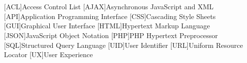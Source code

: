 \documentclass[
  11pt, %
  oneside, %
  english, %
  singlespacing, %
  liststotoc, %
  headsepline, %
  chapterinoneline, %
]{MastersDoctoralThesis} %
\author{Max \textsc{Mustermann}} %
\begin{document}
\frontmatter %

\pagestyle{plain} %

\sloppy





\cleardoublepage







{\hypersetup{linkcolor=black} %
  \tableofcontents %

  \listoffigures %

  \listoftables %

  \lstlistoflistings %
}


  
\chapter{\abbrevname}
\begin{acronym}[AAAAAA]
  [ACL]{Access Control List}
  [AJAX]{Asynchronous JavaScript and XML}
  [API]{Application Programming Interface}
  [CSS]{Cascading Style Sheets}
  [GUI]{Graphical User Interface}
  [HTML]{Hypertext Markup Language}
  [JSON]{JavaScript Object Notation}
  [PHP]{PHP Hypertext Preprocessor}
  [SQL]{Structured Query Language}
  [UID]{User Identifier}
  [URL]{Uniform Resource Locator}
  [UX]{User Experience}
\end{acronym}
\end{document}
